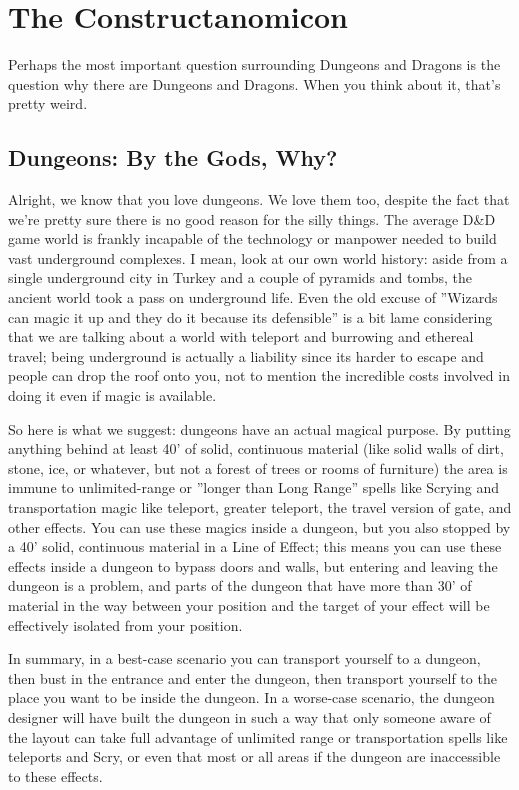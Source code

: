 \section{The Constructanomicon}
\vspace*{-10pt}

Perhaps the most important question surrounding Dungeons and Dragons is the question why there are Dungeons and Dragons. When you think about it, that's pretty weird.

\subsection{Dungeons: By the Gods, Why?}

Alright, we know that you love dungeons. We love them too, despite the fact that we're pretty sure there is no good reason for the silly things. The average D\&D game world is frankly incapable of the technology or manpower needed to build vast underground complexes. I mean, look at our own world history: aside from a single underground city in Turkey and a couple of pyramids and tombs, the ancient world took a pass on underground life. Even the old excuse of ''Wizards can magic it up and they do it because its defensible'' is a bit lame considering that we are talking about a world with teleport and burrowing and ethereal travel; being underground is actually a liability since its harder to escape and people can drop the roof onto you, not to mention the incredible costs involved in doing it even if magic is available.

So here is what we suggest: dungeons have an actual magical purpose. By putting anything behind at least 40' of solid, continuous material (like solid walls of dirt, stone, ice, or whatever, but not a forest of trees or rooms of furniture) the area is immune to unlimited-range or ''longer than Long Range'' spells like Scrying and transportation magic like teleport, greater teleport, the travel version of gate, and other effects. You can use these magics inside a dungeon, but you also stopped by a 40' solid, continuous material in a Line of Effect; this means you can use these effects inside a dungeon to bypass doors and walls, but entering and leaving the dungeon is a problem, and parts of the dungeon that have more than 30' of material in the way between your position and the target of your effect will be effectively isolated from your position.

In summary, in a best-case scenario you can transport yourself to a dungeon, then bust in the entrance and enter the dungeon, then transport yourself to the place you want to be inside the dungeon. In a worse-case scenario, the dungeon designer will have built the dungeon in such a way that only someone aware of the layout can take full advantage of unlimited range or transportation spells like teleports and Scry, or even that most or all areas if the dungeon are inaccessible to these effects.

